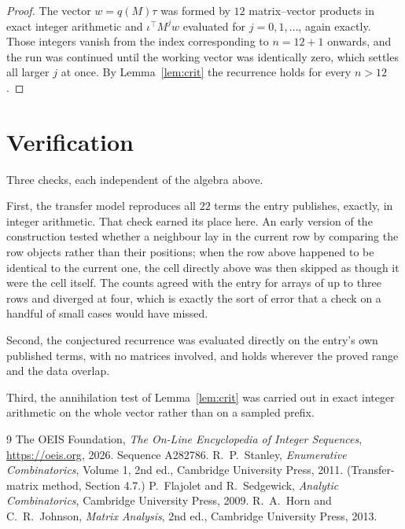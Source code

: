 \documentclass[11pt,a4paper]{article}
\theoremstyle{plain}
\theoremstyle{definition}
\begin{document}
\begin{proof}
The vector $w=q(M)\tau$ was formed by $12$ matrix--vector products in exact integer
arithmetic and $\iota^{\!\top}M^{j}w$ evaluated for $j=0,1,\dots$, again exactly. Those
integers vanish from the index corresponding to $n=12+1$ onwards, and the run was
continued until the working vector was identically zero, which settles all larger $j$ at once.
By Lemma~\ref{lem:crit} the recurrence holds for every $n>12$.
\end{proof}

\section{Verification}

Three checks, each independent of the algebra above.

First, the transfer model reproduces all $22$ terms the entry publishes, exactly, in
integer arithmetic. That check earned its place here. An early version of the construction
tested whether a neighbour lay in the current row by comparing the row objects rather
than their positions; when the row above happened to be identical to the current one, the
cell directly above was then skipped as though it were the cell itself. The counts agreed with
the entry for arrays of up to three rows and diverged at four, which is exactly the sort of
error that a check on a handful of small cases would have missed.

Second, the conjectured recurrence was evaluated directly on the entry's own published terms,
with no matrices involved, and holds wherever the proved range and the data overlap.

Third, the annihilation test of Lemma~\ref{lem:crit} was carried out in exact integer
arithmetic on the whole vector rather than on a sampled prefix.

\begin{thebibliography}{9}
 The OEIS Foundation, \emph{The On-Line Encyclopedia of Integer
Sequences}, \url{https://oeis.org}, 2026. Sequence A282786.
 R.~P.~Stanley, \emph{Enumerative Combinatorics}, Volume 1, 2nd ed.,
Cambridge University Press, 2011. (Transfer-matrix method, Section 4.7.)
 P.~Flajolet and R.~Sedgewick, \emph{Analytic Combinatorics}, Cambridge
University Press, 2009.
 R.~A.~Horn and C.~R.~Johnson, \emph{Matrix Analysis}, 2nd ed., Cambridge
University Press, 2013.
\end{thebibliography}
\end{document}
